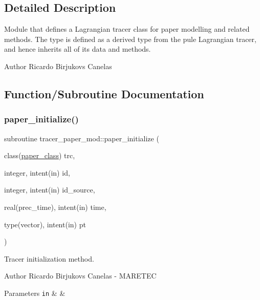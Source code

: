 \subsection{Detailed Description}
Module that defines a Lagrangian tracer class for paper modelling and related methods. The type is defined as a derived type from the pule Lagrangian tracer, and hence inherits all of it\textquotesingle{}s data and methods. 

\begin{DoxyAuthor}{Author}
Ricardo Birjukovs Canelas 
\end{DoxyAuthor}


\subsection{Function/\+Subroutine Documentation}
\mbox{\label{namespacetracer__paper__mod_a4e3b16f967d34cd206499188e17ac4f2}} 
\subsubsection{\texorpdfstring{paper\+\_\+initialize()}{paper\_initialize()}}
{\footnotesize\ttfamily subroutine tracer\+\_\+paper\+\_\+mod\+::paper\+\_\+initialize (\begin{DoxyParamCaption}\item[{class(\hyperlink{structtracer__paper__mod_1_1paper__class}{paper\+\_\+class})}]{trc,  }\item[{integer, intent(in)}]{id,  }\item[{integer, intent(in)}]{id\+\_\+source,  }\item[{real(prec\+\_\+time), intent(in)}]{time,  }\item[{type(vector), intent(in)}]{pt }\end{DoxyParamCaption})\hspace{0.3cm}{\ttfamily [private]}}



Tracer initialization method. 

\begin{DoxyAuthor}{Author}
Ricardo Birjukovs Canelas -\/ M\+A\+R\+E\+T\+EC 
\end{DoxyAuthor}

\begin{DoxyParams}[1]{Parameters}
\mbox{\tt in}  & {\em } & \\
\hline
\end{DoxyParams}
